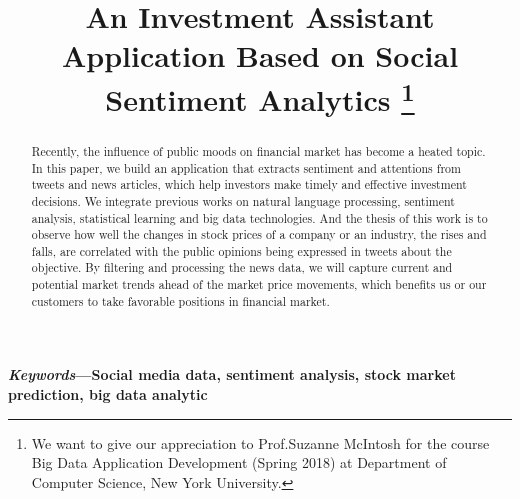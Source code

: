 \documentclass[conference]{IEEEtran}
\begin{document}
\title{An Investment Assistant Application Based on Social Sentiment Analytics\vspace{1.0em}
\thanks{We want to give our appreciation to Prof.Suzanne McIntosh for the course Big Data Application Development (Spring 2018) at Department of Computer Science, New York University.}
}%

\author{
\and
{}
}

\maketitle

\begin{abstract}
Recently, the influence of public moods on financial market has become a heated topic. In this paper, we build an application that extracts sentiment and attentions from tweets and news articles, which help investors make timely and effective investment decisions. We integrate previous works on natural language processing, sentiment analysis, statistical learning and big data technologies. And the thesis of this work is to observe how well the changes in stock prices of a company or an industry, the rises and falls, are correlated with the public opinions being expressed in tweets about the objective. By filtering and processing the news data, we will capture current and potential market trends ahead of the market price movements, which benefits us or our customers to take favorable positions in financial market.
\end{abstract}
\vspace{1.0em}

\textbf{\small\textit{Keywords}---Social media data, sentiment analysis, stock market prediction, big data analytic}
\vspace{1.0em}
\end{document}
